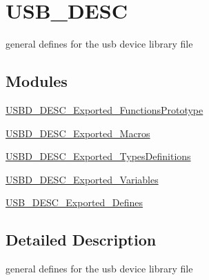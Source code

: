 \hypertarget{group___u_s_b___d_e_s_c}{}\section{U\+S\+B\+\_\+\+D\+E\+SC}
\label{group___u_s_b___d_e_s_c}


general defines for the usb device library file  


\subsection*{Modules}
\begin{DoxyCompactItemize}
\item 
\mbox{\hyperlink{group___u_s_b_d___d_e_s_c___exported___functions_prototype}{U\+S\+B\+D\+\_\+\+D\+E\+S\+C\+\_\+\+Exported\+\_\+\+Functions\+Prototype}}
\item 
\mbox{\hyperlink{group___u_s_b_d___d_e_s_c___exported___macros}{U\+S\+B\+D\+\_\+\+D\+E\+S\+C\+\_\+\+Exported\+\_\+\+Macros}}
\item 
\mbox{\hyperlink{group___u_s_b_d___d_e_s_c___exported___types_definitions}{U\+S\+B\+D\+\_\+\+D\+E\+S\+C\+\_\+\+Exported\+\_\+\+Types\+Definitions}}
\item 
\mbox{\hyperlink{group___u_s_b_d___d_e_s_c___exported___variables}{U\+S\+B\+D\+\_\+\+D\+E\+S\+C\+\_\+\+Exported\+\_\+\+Variables}}
\item 
\mbox{\hyperlink{group___u_s_b___d_e_s_c___exported___defines}{U\+S\+B\+\_\+\+D\+E\+S\+C\+\_\+\+Exported\+\_\+\+Defines}}
\end{DoxyCompactItemize}


\subsection{Detailed Description}
general defines for the usb device library file 

